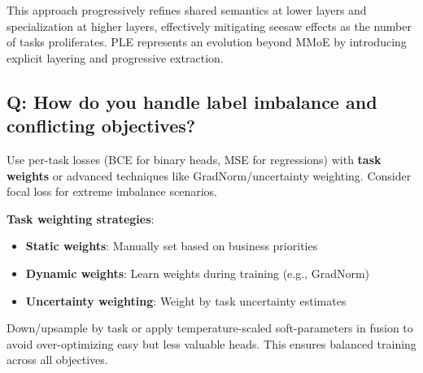 This approach progressively refines shared semantics at lower layers and specialization at higher layers, effectively mitigating seesaw effects as the number of tasks proliferates. PLE represents an evolution beyond MMoE by introducing explicit layering and progressive extraction.

\subsection*{Q: How do you handle label imbalance and conflicting objectives?}
Use per-task losses (BCE for binary heads, MSE for regressions) with \textbf{task weights} or advanced techniques like GradNorm/uncertainty weighting. Consider focal loss for extreme imbalance scenarios.

\textbf{Task weighting strategies}:
\begin{itemize}
	\item \textbf{Static weights}: Manually set based on business priorities
	\item \textbf{Dynamic weights}: Learn weights during training (e.g., GradNorm)
	\item \textbf{Uncertainty weighting}: Weight by task uncertainty estimates
\end{itemize}

Down/upsample by task or apply temperature-scaled soft-parameters in fusion to avoid over-optimizing easy but less valuable heads. This ensures balanced training across all objectives.
